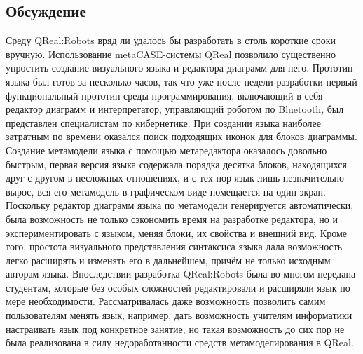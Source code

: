 \documentclass[a4paper]{article}
\begin{document}
{\subsection{Обсуждение}
Среду QReal:Robots вряд ли удалось бы разработать в столь короткие сроки вручную. Использование metaCASE-системы QReal позволило существенно упростить создание визуального языка и редактора диаграмм для него. Прототип языка был готов за несколько часов, так что уже после недели разработки первый функциональный прототип среды программирования, включающий в себя редактор диаграмм и интерпретатор, управляющий роботом по Bluetooth, был представлен специалистам по кибернетике. При создании языка наиболее затратным по времени оказался поиск подходящих иконок для блоков диаграммы. Создание метамодели языка с помощью метаредактора оказалось довольно быстрым, первая версия языка содержала порядка десятка блоков, находящихся друг с другом в несложных отношениях, и с тех пор язык лишь незначительно вырос, вся его метамодель в графическом виде помещается на один экран. Поскольку редактор диаграмм языка по метамодели генерируется автоматически, была возможность не только сэкономить время на разработке редактора, но и экспериментировать с языком, меняя блоки, их свойства и внешний вид. Кроме того, простота визуального представления синтаксиса языка дала возможность легко расширять и изменять его в дальнейшем, причём не только исходным авторам языка. Впоследствии разработка QReal:Robots была во многом передана студентам, которые без особых сложностей редактировали и расширяли язык по мере необходимости. Рассматривалась даже возможность позволить самим пользователям менять язык, например, дать возможность учителям информатики настраивать язык под конкретное занятие, но такая возможность до сих пор не была реализована в силу недоработанности средств метамоделирования в QReal.

}
\end{document}
